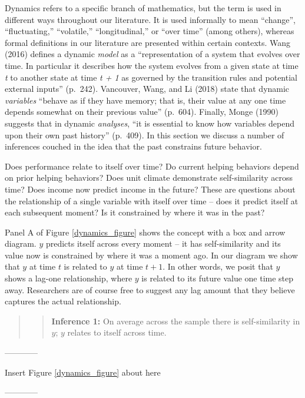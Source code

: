 \documentclass[english,,man]{apa6}
\theoremstyle{definition}
\theoremstyle{definition}
\theoremstyle{definition}
\theoremstyle{remark}
\begin{document}
Dynamics refers to a specific branch of mathematics, but the term is
used in different ways throughout our literature. It is used informally
to mean \enquote{change}, \enquote{fluctuating,} \enquote{volatile,}
\enquote{longitudinal,} or \enquote{over time} (among others), whereas
formal definitions in our literature are presented within certain
contexts. Wang (2016) defines a dynamic \emph{model} as a
\enquote{representation of a system that evolves over time. In
particular it describes how the system evolves from a given state at
time \emph{t} to another state at time \emph{t + 1} as governed by the
transition rules and potential external inputs} (p.~242). Vancouver,
Wang, and Li (2018) state that dynamic \emph{variables} \enquote{behave
as if they have memory; that is, their value at any one time depends
somewhat on their previous value} (p.~604). Finally, Monge (1990)
suggests that in dynamic \emph{analyses}, \enquote{it is essential to
know how variables depend upon their own past history} (p.~409). In this
section we discuss a number of inferences couched in the idea that the
past constrains future behavior.

Does performance relate to itself over time? Do current helping
behaviors depend on prior helping behaviors? Does unit climate
demonstrate self-similarity across time? Does income now predict income
in the future? These are questions about the relationship of a single
variable with itself over time -- does it predict itself at each
subsequent moment? Is it constrained by where it was in the past?

Panel A of Figure \ref{dynamics_figure} shows the concept with a box and
arrow diagram. \(y\) predicts itself across every moment -- it has
self-similarity and its value now is constrained by where it was a
moment ago. In our diagram we show that \(y\) at time \(t\) is related
to \(y\) at time \(t + 1\). In other words, we posit that \(y\) shows a
lag-one relationship, where \(y\) is related to its future value one
time step away. Researchers are of course free to suggest any lag amount
that they believe captures the actual relationship.

\begin{quote}
\begin{quote}
\textbf{Inference 1:} On average across the sample there is
self-similarity in \(y\); \(y\) relates to itself across time.
\end{quote}
\end{quote}

\begin{center}

------------

Insert Figure \ref{dynamics_figure} about here

------------

\end{center}
\end{document}
